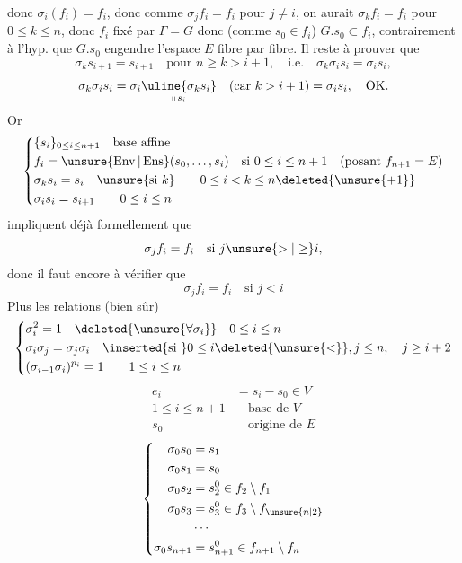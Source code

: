 donc $\sigma_i(f_i)=f_i$, donc comme $\sigma_j f_i=f_i$ pour $j\neq i$, on aurait $\sigma_k f_i=f_i$ pour $0\leq k\leq n$, donc $f_i$ fixé par $\Gamma=G$ donc
(comme $s_0\in f_i$) $G.s_0\subset f_i$, contrairement à l'hyp. que  $G.s_0$ engendre l'espace  $E$ fibre par fibre. Il reste à prouver que
\[
\sigma_k s_{i+1}=s_{i+1}\quad\text{pour }n\geq k>i+1,\quad\text{i.e.}\quad\sigma_k\sigma_i s_i=\sigma_i s_i,
\]
\[
\sigma_k\sigma_i s_i=\sigma_i\underset{\shortparallel\,s_i}{\uline{\sigma_k s_i}}\quad(\text{car }k>i+1)=\sigma_i s_i,\quad\text{OK.}
\]
Or
\[
\left\{\begin{aligned}
&\{s_i\}_{0\leq i\leq n+1}\quad\text{base affine}\\
&f_i=\unsure{\operatorname{Env}|\operatorname{Ens}}(s_0,\ldots,s_i)\quad\text{si }0\leq i\leq n+1\quad(\text{posant }f_{n+1}=E)\\
&\sigma_k s_i=s_i\quad\unsure{\text{si }k}\qquad0\leq i<k\leq n\deleted{\unsure{+1}}\\
&\sigma_i s_i=s_{i+1}\qquad0\leq i\leq n
\end{aligned}\right.
\]
impliquent déjà  formellement que
\[
\sigma_j f_i=f_i\quad\text{si }j\unsure{>|\geq}i,
\]
donc il faut encore à vérifier que 
\[
\sigma_j f_i=f_i\quad\text{si }j<i
\]
 Plus les relations (bien sûr)
\[
\left\{\begin{aligned}
&\sigma_i^2=1\quad\deleted{\unsure{\forall\sigma_i}}\quad0\leq i\leq n\\
&\sigma_i\sigma_j=\sigma_j\sigma_i\quad\inserted{\text{si }}0\leq i\deleted{\unsure{<}},j\leq n,\quad j\geq i+2\\
&(\sigma_{i-1}\sigma_i)^{p_i}=1\qquad1\leq i\leq n
\end{aligned}\right.
\]
\[
\begin{aligned}
e_i&=s_i-s_0\in V\\
1\leq i\leq n+1&\quad\text{base de }V\\
s_0&\quad\text{origine de }E
\end{aligned}
\]
\[
\left\{\begin{aligned}
\sigma_0s_0&=s_1\\
\sigma_0s_1&=s_0\\
\sigma_0s_2&=s_2^0\in f_2\setminus f_1\\
\sigma_0s_3&=s_3^0\in f_3\setminus f_{\unsure{n|2}}\\
&\cdots\\
\sigma_0s_{n+1}&=s_{n+1}^0\in f_{n+1}\setminus f_n
\end{aligned}\right.
\]
